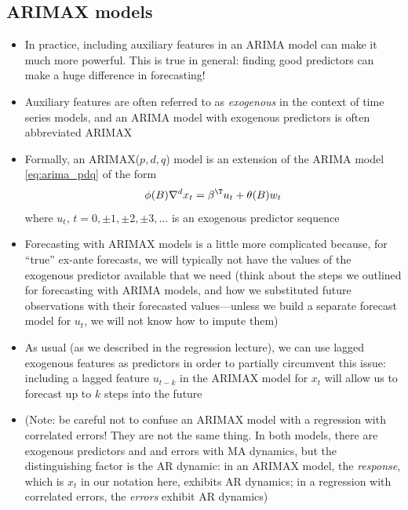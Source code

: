 \documentclass{article}
\begin{document}
\subsection{ARIMAX models}

\begin{itemize}
\item In practice, including auxiliary features in an ARIMA model can make it
  much more powerful. This is true in general: finding good predictors can make
  a huge difference in forecasting!

\item Auxiliary features are often referred to as \emph{exogenous} in the
  context of time series models, and an ARIMA model with exogenous predictors is
  often abbreviated ARIMAX 

\item Formally, an ARIMAX($p,d,q$) model is an extension of the ARIMA model 
  \eqref{eq:arima_pdq} of the form 
  \[
  \phi(B) \nabla^d x_t = \beta^\T u_t + \theta(B) w_t
  \]
  where $u_t$, $t = 0, \pm 1, \pm 2, \pm 3, \dots$ is an exogenous predictor
  sequence 

\item Forecasting with ARIMAX models is a little more complicated because, for
  ``true'' ex-ante forecasts, we will typically not have the values of the
  exogenous predictor available that we need (think about the steps we outlined
  for forecasting with ARIMA models, and how we substituted future observations
  with their forecasted values---unless we build a separate forecast model for
  $u_t$, we will not know how to impute them) 

\item As usual (as we described in the regression lecture), we can use lagged
  exogenous features as predictors in order to partially circumvent this
  issue: including a lagged feature $u_{t-k}$ in the ARIMAX model for $x_t$ will
  allow us to forecast up to $k$ steps into the future

\item (Note: be careful not to confuse an ARIMAX model with a regression with 
  correlated errors! They are not the same thing. In both models, there are
  exogenous predictors and and errors with MA dynamics, but the distinguishing  
  factor is the AR dynamic: in an ARIMAX model, the \emph{response}, which is
  $x_t$ in our notation here, exhibits AR dynamics; in a regression with
  correlated errors, the \emph{errors} exhibit AR dynamics)
\end{itemize}
\end{document}
